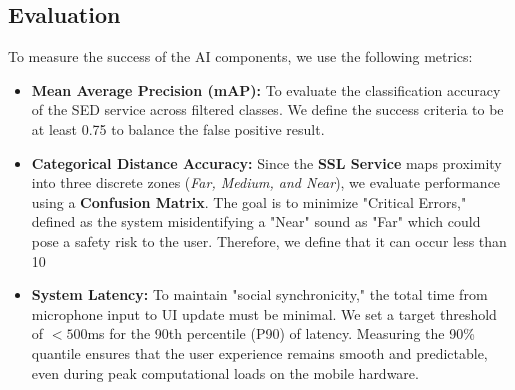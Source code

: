 \subsection{Evaluation}
To measure the success of the AI components, we use the following metrics:
\begin{itemize}
    \item \textbf{Mean Average Precision (mAP):} To evaluate the classification accuracy of the SED service across filtered classes. We define the success criteria to be at least 0.75 to balance the false positive result.
    \item \textbf{Categorical Distance Accuracy:} Since the \textbf{SSL Service} maps proximity into three discrete zones (\textit{Far, Medium, and Near}), we evaluate performance using a \textbf{Confusion Matrix}. The goal is to minimize "Critical Errors," defined as the system misidentifying a "Near" sound as "Far" which could pose a safety risk to the user. Therefore, we define that it can occur less than 10%
    \item \textbf{System Latency:} To maintain "social synchronicity," the total time from microphone input to UI update must be minimal. We set a target threshold of $<500$ms for the 90th percentile (P90) of latency. Measuring the 90\% quantile ensures that the user experience remains smooth and predictable, even during peak computational loads on the mobile hardware.
\end{itemize}